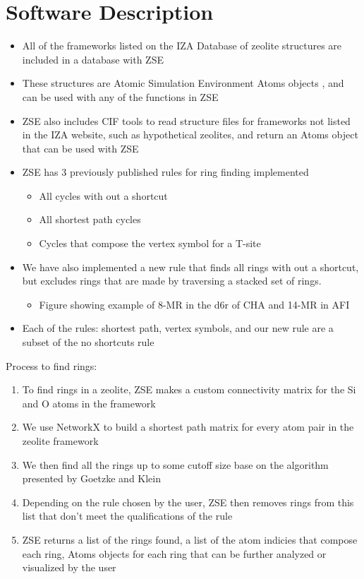 \documentclass[11pt]{article}
\begin{document}
\section*{Software Description}
\label{sec:org9ec0fdb}

\begin{itemize}
\item All of the frameworks listed on the IZA Database of zeolite structures \cite{IZA} are included in a database with ZSE
\item These structures are Atomic Simulation Environment Atoms objects \cite{larsen-atomic-2017}, and can be used with any of the functions in ZSE
\item ZSE also includes CIF tools to read structure files for frameworks not listed in the IZA website, such as hypothetical zeolites, and return an Atoms object that can be used with ZSE
\item ZSE has 3 previously published rules for ring finding implemented
\begin{itemize}
\item All cycles with out a shortcut \cite{goetzke-properties-1991}
\item All shortest path cycles \cite{sastre-topological-2009}
\item Cycles that compose the vertex symbol for a T-site \cite{okeeffe-vertex-1997}
\end{itemize}
\item We have also implemented a new rule that finds all rings with out a shortcut, but excludes rings that are made by traversing a stacked set of rings.
\begin{itemize}
\item Figure showing example of 8-MR in the d6r of CHA and 14-MR in AFI
\end{itemize}
\item Each of the rules: shortest path, vertex symbols, and our new rule are a subset of the no shortcuts rule
\end{itemize}
Process to find rings:
\begin{enumerate}
\item To find rings in a zeolite, ZSE makes a custom connectivity matrix for the Si and O atoms in the framework
\item We use NetworkX \cite{SciPyProceedings-11} to build a shortest path matrix for every atom pair in the zeolite framework
\item We then find all the rings up to some cutoff size base on the algorithm presented by Goetzke and Klein \cite{goetzke-properties-1991}
\item Depending on the rule chosen by the user, ZSE then removes rings from this list that don't meet the qualifications of the rule
\item ZSE returns a list of the rings found, a list of the atom indicies that compose each ring, Atoms objects for each ring that can be further analyzed or visualized by the user
\end{enumerate}
\end{document}
